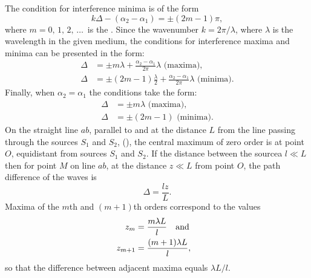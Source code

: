 The condition for interference minima is of the form
\begin{equation*}%
k\Delta - (\alpha_{2} - \alpha_{1}) = \pm (2m -1) \pi,
\end{equation*}
where $m = 0, \,1,\, 2,\, \ldots{\,}$ is the . Since the wavenumber $k = 2\pi/\lambda$, where $\lambda$ is the wavelength in the given medium, the conditions for interference maxima and minima can be presented in the form:
\begin{align*}%
\Delta & = \pm m \lambda + \frac{\alpha_{2} - \alpha_{1}}{2 \pi} \lambda \,\, \text{(maxima)}, \\
\Delta & = \pm (2m -1) \frac{\lambda}{2} + \frac{\alpha_{2} - \alpha_{1}}{2 \pi} \lambda \,\, \text{(minima)}.
\end{align*}
Finally, when $\alpha_{2} = \alpha_{1}$ the conditions take the form:
\begin{align*}%
\Delta & = \pm m \lambda \,\, \text{(maxima)}, \\
\Delta & = \pm (2m -1)  \,\, \text{(minima)}.
\end{align*}
On the straight line $ab$, parallel to and at the distance $L$ from the line passing through the sources $S_{1}$ and $S_{2}$, (), the central maximum of zero order is at point $O$, equidistant from sources $S_{1}$ and $S_{2}$. If the distance between the sourcea $l \ll L$ then for point $M$ on line $ab$, at the distance $z \ll L$ from point $O$, the path difference of the waves is
\begin{equation*}%
\Delta = \frac{lz}{L}.
\end{equation*}
Maxima of the $m$th and $(m + 1)$th orders correspond to the values
\begin{align*}%
z_{m} & = \frac{m \lambda L}{l} \qand \\
z_{m + 1} & = \frac{(m + 1) \lambda L}{l},
\end{align*}
so that the difference between adjacent maxima equals $\lambda L/l$. 


